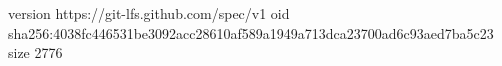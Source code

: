 version https://git-lfs.github.com/spec/v1
oid sha256:4038fc446531be3092acc28610af589a1949a713dca23700ad6c93aed7ba5c23
size 2776
